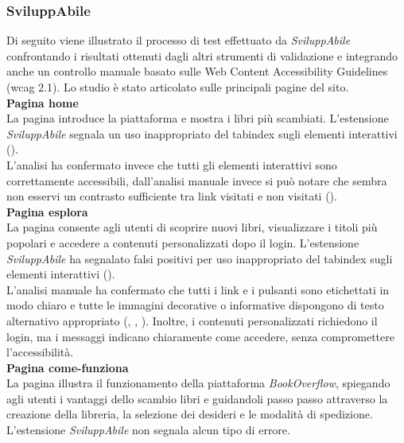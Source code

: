 \subsubsection{SviluppAbile}
\noindent Di seguito viene illustrato il processo di test effettuato da \textit{SviluppAbile} confrontando i risultati ottenuti dagli altri strumenti di validazione e integrando anche un controllo manuale basato sulle Web Content Accessibility Guidelines (\acrshort{wcag} 2.1). Lo studio è stato articolato sulle principali pagine del sito.\\

\noindent \textbf{Pagina home}\\
La pagina introduce la piattaforma e mostra i libri più scambiati. 
L’estensione \textit{SviluppAbile} segnala un uso inappropriato del tabindex sugli elementi interattivi ({}).\\
L’analisi ha confermato invece che tutti gli elementi interattivi sono correttamente accessibili, dall'analisi manuale invece si può notare che sembra non esservi un contrasto sufficiente tra link visitati e non visitati ({}).\\

\noindent \textbf{Pagina esplora}\\
La pagina consente agli utenti di scoprire nuovi libri, visualizzare i titoli più popolari e accedere a contenuti personalizzati dopo il login. 
L’estensione \textit{SviluppAbile} ha segnalato falsi positivi per uso inappropriato del tabindex sugli elementi interattivi ({}).\\
L’analisi manuale ha confermato che tutti i link e i pulsanti sono etichettati in modo chiaro e tutte le immagini decorative o informative dispongono di testo alternativo appropriato ({}, {}, {}). Inoltre, i contenuti personalizzati richiedono il login, ma i messaggi indicano chiaramente come accedere, senza compromettere l’accessibilità.\\

\noindent \textbf{Pagina come-funziona}\\
La pagina illustra il funzionamento della piattaforma \textit{BookOverflow}, spiegando agli utenti i vantaggi dello scambio libri e guidandoli passo passo attraverso la creazione della libreria, la selezione dei desideri e le modalità di spedizione. 
L’estensione \textit{SviluppAbile} non segnala alcun tipo di errore.\\

